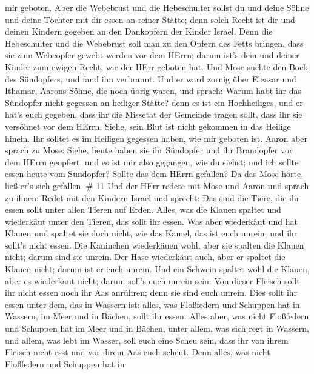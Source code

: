 mir geboten.  Aber die Webebrust und die Hebeschulter
sollst du und deine Söhne und deine Töchter mit dir essen an reiner
Stätte; denn solch Recht ist dir und deinen Kindern gegeben an den
Dankopfern der Kinder Israel.  Denn die Hebeschulter und
die Webebrust soll man zu den Opfern des Fetts bringen, dass sie zum
Webeopfer gewebt werden vor dem HErrn; darum ist's dein und deiner
Kinder zum ewigen Recht, wie der HErr geboten hat.  Und
Mose suchte den Bock des Sündopfers, und fand ihn verbrannt. Und er ward
zornig über Eleasar und Ithamar, Aarons Söhne, die noch übrig waren, und
sprach:  Warum habt ihr das Sündopfer nicht gegessen an
heiliger Stätte? denn es ist ein Hochheiliges, und er hat's euch
gegeben, dass ihr die Missetat der Gemeinde tragen sollt, dass ihr sie
versöhnet vor dem HErrn.  Siehe, sein Blut ist nicht
gekommen in das Heilige hinein. Ihr solltet es im Heiligen gegessen
haben, wie mir geboten ist.  Aaron aber sprach zu Mose:
Siehe, heute haben sie ihr Sündopfer und ihr Brandopfer vor dem HErrn
geopfert, und es ist mir also gegangen, wie du siehst; und ich sollte
essen heute vom Sündopfer? Sollte das dem HErrn gefallen? 
Da das Mose hörte, ließ er's sich gefallen. \# 11  Und der
HErr redete mit Mose und Aaron und sprach zu ihnen:  Redet
mit den Kindern Israel und sprecht: Das sind die Tiere, die ihr essen
sollt unter allen Tieren auf Erden.  Alles, was die Klauen
spaltet und wiederkäut unter den Tieren, das sollt ihr essen.
 Was aber wiederkäut und hat Klauen und spaltet sie doch
nicht, wie das Kamel, das ist euch unrein, und ihr sollt's nicht essen.
 Die Kaninchen wiederkäuen wohl, aber sie spalten die Klauen
nicht; darum sind sie unrein.  Der Hase wiederkäut auch,
aber er spaltet die Klauen nicht; darum ist er euch unrein. 
Und ein Schwein spaltet wohl die Klauen, aber es wiederkäut nicht; darum
soll's euch unrein sein.  Von dieser Fleisch sollt ihr nicht
essen noch ihr Aas anrühren; denn sie sind euch unrein. 
Dies sollt ihr essen unter dem, das in Wassern ist: alles, was
Floßfedern und Schuppen hat in Wassern, im Meer und in Bächen, sollt ihr
essen.  Alles aber, was nicht Floßfedern und Schuppen hat
im Meer und in Bächen, unter allem, was sich regt in Wassern, und allem,
was lebt im Wasser, soll euch eine Scheu sein,  dass ihr
von ihrem Fleisch nicht esst und vor ihrem Aas euch scheut.
 Denn alles, was nicht Floßfedern und Schuppen hat in
